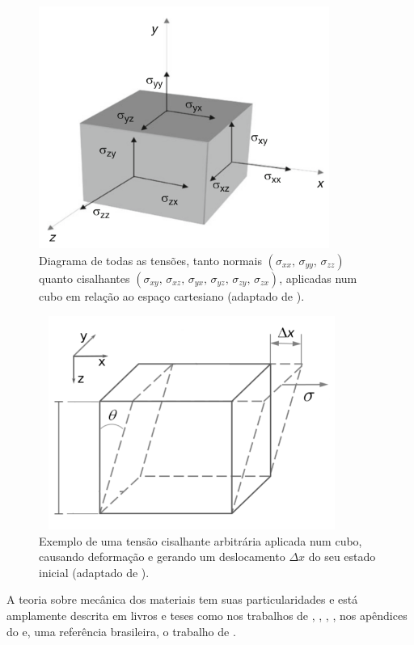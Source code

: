 \documentclass[
	12pt,				%
	openright,			%
	oneside,			%
	a4paper,			%
	english,			%
	brazil				%
	]{abntex2}
\begin{document}
    \begin{figure}[htp!]
		\centering
		\includegraphics[width=9.5cm,height=8cm]{../imagens/stress.png}
		\caption{Diagrama de todas as tensões, tanto normais $(\sigma_{xx},\,\sigma_{yy},\,\sigma_{zz})$ quanto cisalhantes $(\sigma_{xy},\,\sigma_{xz},\,\sigma_{yx},\,\sigma_{yz},\,\sigma_{zy},\,\sigma_{zx})$, aplicadas num cubo em relação ao espaço cartesiano (adaptado de ).}
		\label{stress}
	\end{figure}

    \begin{figure}[htp!]
		\centering
		\includegraphics[width=10cm,height=7cm]{../imagens/shear.png}
		\caption{Exemplo de uma tensão cisalhante arbitrária aplicada num cubo, causando deformação e gerando um deslocamento $\Delta x$ do seu estado inicial (adaptado de ).}
		\label{strain}
	\end{figure}

	A teoria sobre mecânica dos materiais tem suas particularidades e está amplamente descrita em livros e teses como nos trabalhos de , , , , nos apêndices do  e, uma referência brasileira, o trabalho de .
	
\end{document}
